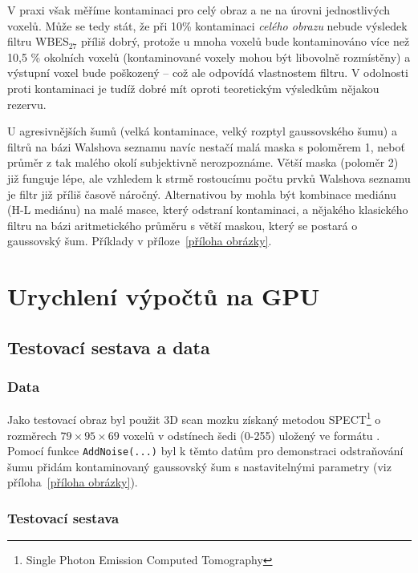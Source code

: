      \vspace{0.5cm}
     
     V praxi však měříme kontaminaci pro celý obraz a ne na úrovni jednostlivých voxelů. Může se tedy stát, že při 10\% kontaminaci \emph{celého obrazu} nebude výsledek filtru WBES$_{\mathrm{27}}$ příliš dobrý, protože u mnoha voxelů bude kontaminováno více než 10,5 \% okolních voxelů (kontaminované voxely mohou být libovolně rozmístěny) a výstupní voxel bude poškozený -- což ale odpovídá vlastnostem filtru. V odolnosti proti kontaminaci je tudíž dobré mít oproti teoretickým výsledkům nějakou rezervu.
     
     U agresivnějších šumů (velká kontaminace, velký rozptyl gaussovského šumu) a filtrů na bázi Walshova seznamu navíc nestačí malá maska s poloměrem 1, neboť průměr z tak malého okolí subjektivně nerozpoznáme. Větší maska (poloměr 2) již funguje lépe, ale vzhledem k strmě rostoucímu počtu prvků Walshova seznamu je filtr již příliš časově náročný. Alternativou by mohla být kombinace mediánu (H-L mediánu) na malé masce, který odstraní kontaminaci, a nějakého klasického filtru na bázi aritmetického průměru s větší maskou, který se postará o gaussovský šum. Příklady v příloze~\ref{příloha obrázky}.

\section{Urychlení výpočtů na GPU}

    \subsection{Testovací sestava a data}
    
    \subsubsection{Data}
        
        Jako testovací obraz byl použit 3D scan mozku získaný metodou SPECT\footnote{Single Photon Emission Computed Tomography} o rozměrech $79 \times 95 \times 69$ voxelů v odstínech šedi (0-255) uložený ve formátu \Analyze. Pomocí funkce {\tt AddNoise(...)} byl k těmto datům pro demonstraci odstraňování šumu přidám kontaminovaný gaussovský šum s nastavitelnými parametry (viz příloha~\ref{příloha obrázky}).
        
    \subsubsection{Testovací sestava}
    
